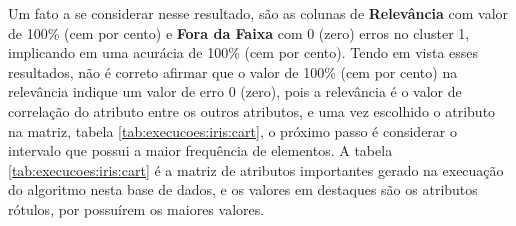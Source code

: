 
Um fato a se considerar nesse resultado, são as colunas de \textbf{Relevância} com valor de 100\% (cem por cento) e \textbf{Fora da Faixa} com 0 (zero) erros no cluster 1, implicando em uma acurácia de 100\% (cem por cento). Tendo em vista esses resultados, não é correto afirmar que o valor de   100\% (cem por cento) na relevância indique um valor de erro 0 (zero), pois a relevância é o valor de correlação do atributo entre os outros atributos, e uma vez escolhido o atributo na matriz, tabela \ref{tab:execucoes:iris:cart}, o próximo passo é considerar o intervalo que possui a maior frequência de elementos. A tabela \ref{tab:execucoes:iris:cart} é a matriz de atributos importantes gerado na execuação do algoritmo nesta base de dados, e os valores em destaques são os atributos rótulos, por possuírem os maiores valores.

\begin{table}[!h]
\centering
\caption{Matriz de Atributos Importantes do algoritmo Naive Bayes na base Iris}
\label{tab:execucoes:iris:cart}
\end{table}    


